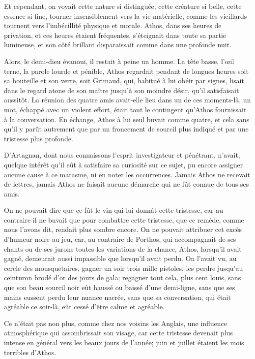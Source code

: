 Et cependant, on voyait cette nature si distinguée, cette créature si belle, cette essence si fine, tourner insensiblement vers la vie matérielle, comme les vieillards tournent vers l'imbécillité physique et morale. Athos, dans ses heures de privation, et ces heures étaient fréquentes, s'éteignait dans toute sa partie lumineuse, et son côté brillant disparaissait comme dans une profonde nuit. 

Alors, le demi-dieu évanoui, il restait à peine un homme. La tête basse, l'œil terne, la parole lourde et pénible, Athos regardait pendant de longues heures soit sa bouteille et son verre, soit Grimaud, qui, habitué à lui obéir par signes, lisait dans le regard atone de son maître jusqu'à son moindre désir, qu'il satisfaisait aussitôt. La réunion des quatre amis avait-elle lieu dans un de ces moments-là, un mot, échappé avec un violent effort, était tout le contingent qu'Athos fournissait à la conversation. En échange, Athos à lui seul buvait comme quatre, et cela sans qu'il y parût autrement que par un froncement de sourcil plus indiqué et par une tristesse plus profonde. 

D'Artagnan, dont nous connaissons l'esprit investigateur et pénétrant, n'avait, quelque intérêt qu'il eût à satisfaire sa curiosité sur ce sujet, pu encore assigner aucune cause à ce marasme, ni en noter les occurrences. Jamais Athos ne recevait de lettres, jamais Athos ne faisait aucune démarche qui ne fût connue de tous ses amis. 

On ne pouvait dire que ce fût le vin qui lui donnât cette tristesse, car au contraire il ne buvait que pour combattre cette tristesse, que ce remède, comme nous l'avons dit, rendait plus sombre encore. On ne pouvait attribuer cet excès d'humeur noire au jeu, car, au contraire de Porthos, qui accompagnait de ses chants ou de ses jurons toutes les variations de la chance, Athos, lorsqu'il avait gagné, demeurait aussi impassible que lorsqu'il avait perdu. On l'avait vu, au cercle des mousquetaires, gagner un soir trois mille pistoles, les perdre jusqu'au ceinturon brodé d'or des jours de gala; regagner tout cela, plus cent louis, sans que son beau sourcil noir eût haussé ou baissé d'une demi-ligne, sans que ses mains eussent perdu leur nuance nacrée, sans que sa conversation, qui était agréable ce soir-là, eût cessé d'être calme et agréable. 

Ce n'était pas non plus, comme chez nos voisins les Anglais, une influence atmosphérique qui assombrissait son visage, car cette tristesse devenait plus intense en général vers les beaux jours de l'année; juin et juillet étaient les mois terribles d'Athos. 

